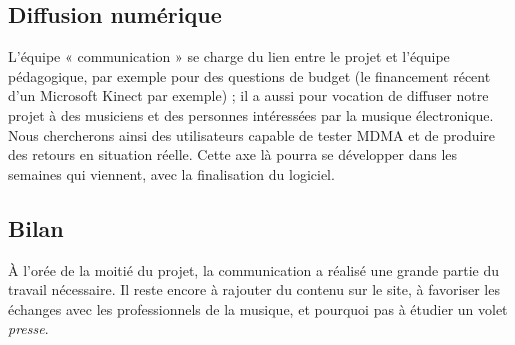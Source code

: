 \subsection{Diffusion numérique}
\par L'équipe « communication » se charge du lien entre le projet et l'équipe pédagogique, par exemple pour des questions de budget (le financement récent d'un Microsoft Kinect par exemple) ; il a aussi pour vocation de diffuser notre projet à des musiciens et des personnes intéressées par la musique électronique. Nous chercherons ainsi des utilisateurs capable de tester MDMA et de produire des retours en situation réelle. Cette axe là pourra se développer dans les semaines qui viennent, avec la finalisation du logiciel.
\subsection{Bilan}
\par À l'orée de la moitié du projet, la communication a réalisé une grande partie du travail nécessaire. Il reste encore à rajouter du contenu sur le site, à favoriser les échanges avec les professionnels de la musique, et pourquoi pas à étudier un volet \emph{presse}.


